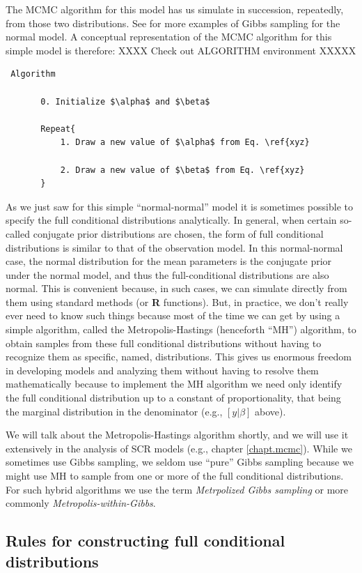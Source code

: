 The MCMC algorithm for this model has us simulate in succession,
repeatedly, from those two distributions. See \citet{gelman_etal:2004}
for more examples of Gibbs sampling for the normal model. A
conceptual representation of the MCMC algorithm for this simple model
is therefore:
XXXX Check out ALGORITHM environment XXXXX
\begin{verbatim}
 Algorithm

       0. Initialize $\alpha$ and $\beta$

       Repeat{
           1. Draw a new value of $\alpha$ from Eq. \ref{xyz}

           2. Draw a new value of $\beta$ from Eq. \ref{xyz}
       }
\end{verbatim}

As we just saw for this simple ``normal-normal'' model it is sometimes
possible to specify the full conditional distributions
analytically. In general, when certain so-called conjugate prior
distributions are chosen, the form of full conditional distributions
is similar to that of the observation model. In this normal-normal
case, the normal distribution for the mean parameters is the conjugate
prior under the normal model, and thus the full-conditional
distributions are also normal. This is convenient because, in such
cases, we can simulate directly from them using standard methods (or
{\bf R}
functions).  But, in practice, we don't really ever need to know such
things because most of the time we can get by using a simple
algorithm, called the Metropolis-Hastings (henceforth ``MH'')
algorithm, to obtain samples from these full conditional distributions
without having to recognize them as specific, named, distributions. 
This gives us enormous freedom in developing models
and analyzing them without having to resolve them mathematically
because to implement the MH algorithm we need only identify the full
conditional distribution up to a constant of proportionality, that
being the marginal distribution in the denominator (e.g., $[y|\beta]$
above).

We will talk about the Metropolis-Hastings algorithm shortly, and we
will use it extensively in the analysis of SCR models (e.g., chapter
\ref{chapt.mcmc}). While we sometimes use Gibbs sampling, we seldom
use ``pure'' Gibbs sampling because we might use MH to sample from one
or more of the full conditional distributions. For such hybrid
algorithms we use the term {\it Metrpolized Gibbs sampling} or
more commonly {\it Metropolis-within-Gibbs}.

\subsection{Rules for constructing full conditional distributions}  

